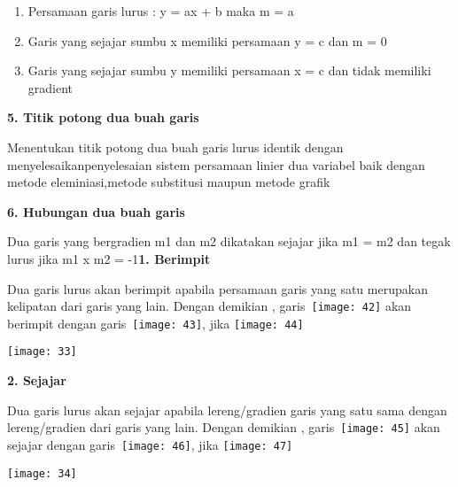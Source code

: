 \documentclass[11pt,fleqn]{book} %
\begin{document}
\begin{myEnumerate}
\begin{itemize}
\begin{enumerate}
\item  Persamaan garis lurus : y = ax + b maka m = a

\item  Garis yang sejajar sumbu x memiliki persamaan y = c dan m = 0

\item  Garis yang sejajar sumbu y memiliki persamaan x = c dan tidak memiliki gradient
\end{enumerate}

\noindent \textbf{5.  Titik potong dua buah garis}

\noindent \textbf{}

\noindent Menentukan titik potong dua buah garis lurus identik dengan menyelesaikanpenyelesaian sistem persamaan linier dua variabel baik dengan metode eleminiasi,metode substitusi maupun metode grafik

\noindent 

\noindent \textbf{6.   Hubungan dua buah garis}

\noindent Dua garis yang bergradien m1 dan m2 dikatakan sejajar jika m1 = m2 dan tegak lurus jika m1 x m2 = -1\textbf{1. Berimpit}

\noindent Dua garis lurus akan berimpit apabila persamaan garis yang satu merupakan kelipatan dari garis yang lain. Dengan demikian , garis~\texttt{[image: 42]} akan berimpit dengan garis~\texttt{[image: 43]}, jika \texttt{[image: 44]}

\begin{center}
\noindent \texttt{[image: 33]}\textbf{}
\end{center}

\noindent \textbf{}

\noindent \textbf{2. Sejajar}

\noindent Dua garis lurus akan sejajar apabila lereng/gradien garis yang satu sama dengan lereng/gradien dari garis yang lain. Dengan demikian , garis~\texttt{[image: 45]} akan sejajar dengan garis~\texttt{[image: 46]}, jika \texttt{[image: 47]}

\begin{center}
\noindent \texttt{[image: 34]}
\end{center}


\end{itemize}
\end{myEnumerate}
\end{document}
